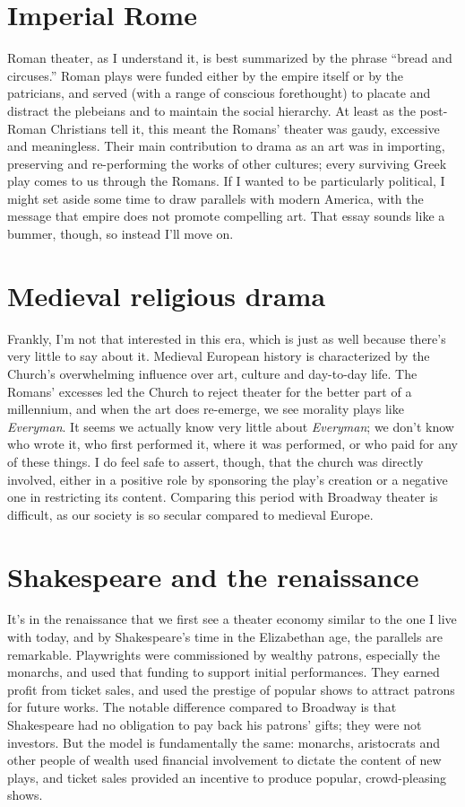 \section*{Imperial Rome}

Roman theater, as I understand it, is best summarized by the phrase \enquote{bread and
  circuses.} Roman plays were funded either by the empire itself or by the patricians, and
served (with a range of conscious forethought) to placate and distract the plebeians and
to maintain the social hierarchy. At least as the post-Roman Christians tell it, this
meant the Romans' theater was gaudy, excessive and meaningless. Their main contribution to
drama as an art was in importing, preserving and re-performing the works of other
cultures; every surviving Greek play comes to us through the Romans. If I wanted to be
particularly political, I might set aside some time to draw parallels with modern America,
with the message that empire does not promote compelling art. That essay sounds like a
bummer, though, so instead I'll move on.

\section*{Medieval religious drama}

Frankly, I'm not that interested in this era, which is just as well because there's very
little to say about it. Medieval European history is characterized by the Church's
overwhelming influence over art, culture and day-to-day life. The Romans' excesses led the
Church to reject theater for the better part of a millennium, and when the art does
re-emerge, we see morality plays like \textit{Everyman}. It seems we actually know very
little about \textit{Everyman}; we don't know who wrote it, who first performed it, where
it was performed, or who paid for any of these things. I do feel safe to assert, though,
that the church was directly involved, either in a positive role by sponsoring the play's
creation or a negative one in restricting its content. Comparing this period with Broadway
theater is difficult, as our society is so secular compared to medieval Europe.

\section*{Shakespeare and the renaissance}

It's in the renaissance that we first see a theater economy similar to the one I live with
today, and by Shakespeare's time in the Elizabethan age, the parallels are
remarkable. Playwrights were commissioned by wealthy patrons, especially the monarchs, and
used that funding to support initial performances. They earned profit from ticket sales,
and used the prestige of popular shows to attract patrons for future works. The notable
difference compared to Broadway is that Shakespeare had no obligation to pay back his
patrons' gifts; they were not investors. But the model is fundamentally the same:
monarchs, aristocrats and other people of wealth used financial involvement to dictate the
content of new plays, and ticket sales provided an incentive to produce popular,
crowd-pleasing shows.

